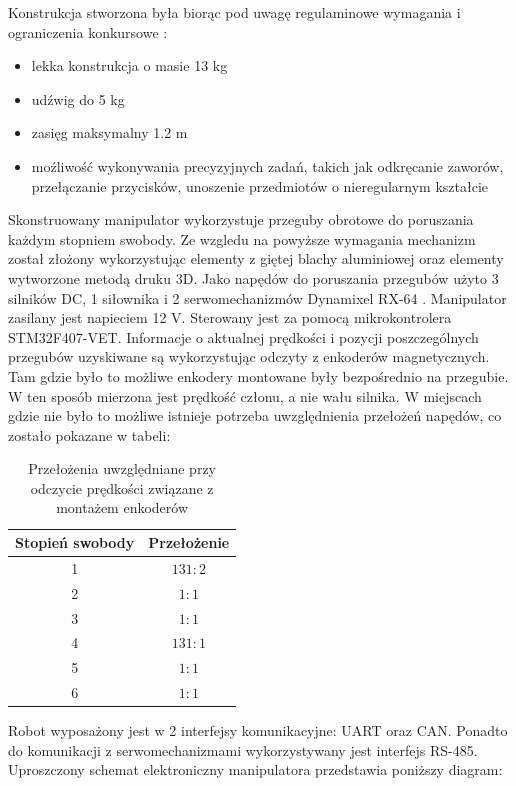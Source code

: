 \documentclass[a4paper, 12pt, twoside]{article}
\begin{document}
Konstrukcja stworzona była biorąc pod uwagę regulaminowe wymagania i ograniczenia konkursowe \cite{competitionwebsite}:

\begin{itemize}
\item lekka konstrukcja o masie 13 kg
\item udźwig do 5 kg
\item zasięg maksymalny 1.2 m
\item moźliwość wykonywania precyzyjnych zadań, takich jak odkręcanie zaworów, przełączanie przycisków, unoszenie przedmiotów o nieregularnym kształcie
\end{itemize}

Skonstruowany manipulator wykorzystuje przeguby obrotowe do poruszania każdym stopniem swobody. Ze wzgledu na powyższe wymagania mechanizm został złożony wykorzystując elementy z giętej blachy aluminiowej oraz elementy wytworzone metodą druku 3D. Jako napędów do poruszania przegubów użyto 3 silników DC, 1 siłownika i 2 serwomechanizmów Dynamixel RX-64 \cite{servo}. Manipulator zasilany jest napieciem 12 V. Sterowany jest za pomocą mikrokontrolera STM32F407-VET. Informacje o aktualnej prędkości i pozycji poszczególnych przegubów uzyskiwane są wykorzystując odczyty z enkoderów magnetycznych. Tam gdzie było to możliwe enkodery montowane były bezpośrednio na przegubie. W ten sposób mierzona jest prędkość członu, a nie wału silnika. W miejscach gdzie nie było to możliwe istnieje potrzeba uwzględnienia przełożeń napędów, co zostało pokazane w tabeli:

\begin{table}[htb!]
\begin{center}
\caption{Przełożenia uwzględniane przy odczycie prędkości związane z montażem enkoderów}
\begin{tabular}{ | c | c |}
\hline
 Stopień swobody & Przełożenie \\ 
\hline
 1 & $131:2$ \\ 
\hline
 2 & $1:1$ \\
\hline
 3 & $1:1$  \\
\hline
 4 & $131:1$  \\ 
\hline
 5 & $1:1$  \\
\hline
 6 & $1:1$ \\
 \hline
\end{tabular}
\end{center}
\end{table}

Robot wyposażony jest w 2 interfejsy komunikacyjne: UART oraz CAN. Ponadto do komunikacji z serwomechanizmami wykorzystywany jest interfejs RS-485. Uproszczony schemat elektroniczny manipulatora przedstawia poniższy diagram:
\end{document}
